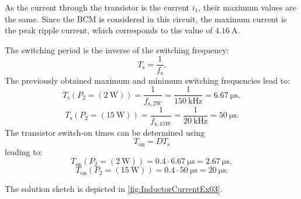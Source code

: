  \begin{solutionblock}
    As the current through the transistor is the current $i_1$, their maximum values are the same. Since the BCM is considered in this circuit, the maximum current is the peak ripple current, which corresponds to the value of $\SI{4.16}{\ampere}$.
 \end{solutionblock}

 \begin{solutionblock}
 The switching period is the inverse of the switching frequency: 
 \begin{equation}
    T_\mathrm{s} = \frac{1}{f_\mathrm{s}}. \label{switching frequency}
 \end{equation}
 The previously obtained maximum and minimum switching frequencies lead to:
 \begin{equation}
    T_\mathrm{s}(P_\mathrm{2}=(\SI{2}{\watt})) =\frac{1}{f_{\mathrm{s,2W}}} = \frac{1}{\SI{150}{\kilo \hertz}}= \SI{6.67}{\micro \s},
 \end{equation}
 \begin{equation}
    T_\mathrm{s}(P_\mathrm{2}=(\SI{15}{\watt})) =\frac{1}{f_{\mathrm{s,15W}}} = \frac{1}{\SI{20}{\kilo \hertz}}= \SI{50}{\micro \s}.
 \end{equation}
 The transistor switch-on times can be determined using 
 \begin{equation}
    T_\mathrm{on} = D T_\mathrm{s} \label{absolut value switch-on-times}
 \end{equation}
 leading to:
 \begin{equation}
    T_\mathrm{on}(P_\mathrm{2}=(\SI{2}{\watt})) = 0.4 \cdot \SI{6.67}{\micro \s} = \SI{2.67}{\micro \s},
 \end{equation}
 \begin{equation}
    T_\mathrm{on}(P_\mathrm{2}=(\SI{15}{\watt})) = 0.4 \cdot \SI{50}{\micro \s}= \SI{20}{\micro \s}.
 \end{equation}
 \end{solutionblock}

\begin{solutionblock}
    The solution sketch is depicted in \autoref{fig:InductorCurrentEx03}.
       
\end{solutionblock}
    
